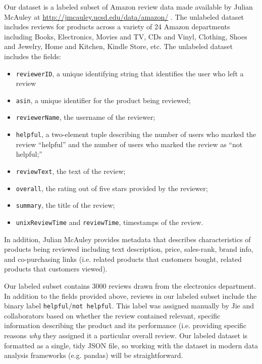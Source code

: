 \documentclass[a4paper]{article}
\begin{document}
Our dataset is a labeled subset of Amazon review data made available by Julian McAuley at \url{http://jmcauley.ucsd.edu/data/amazon/} \cite{he2016ups, mcauley2015image}.
The unlabeled dataset includes reviews for products across a variety of 24 Amazon departments including Books, Electronics, Movies and TV, CDs and Vinyl, Clothing, Shoes and Jewelry, Home and Kitchen, Kindle Store, etc.
The unlabeled dataset includes the fields:
\begin{itemize}
\item \texttt{reviewerID}, a unique identifying string that identifies the user who left a review
\item \texttt{asin}, a unique identifier for the product being reviewed;
\item \texttt{reviewerName}, the username of the reviewer;
\item \texttt{helpful}, a two-element tuple describing the number of users who marked the review ``helpful'' and the number of users who marked the review as ``not helpful;''
\item \texttt{reviewText}, the text of the review;
\item \texttt{overall}, the rating out of five stars provided by the reviewer;
\item \texttt{summary}, the title of the review;
\item \texttt{unixReviewTime} and \texttt{reviewTime}, timestamps of the review.
\end{itemize}


In addition, Julian McAuley provides metadata that describes characteristics of products being reviewed including text description, price, sales-rank, brand info, and co-purchasing links (i.e. related products that customers bought, related products that customers viewed).

Our labeled subset contains 3000 reviews drawn from the electronics department.
In addition to the fields provided above, reviews in our labeled subset include the binary label \texttt{helpful}/\texttt{not helpful}.
This label was assigned manually by Jie and collaborators based on whether the review contained relevant, specific information describing the product and its performance (i.e. providing specific reasons \textit{why} they assigned it a particular overall review.
Our labeled dataset is formatted as a single, tidy JSON file, so working with the dataset in modern data analysis frameworks (e.g. pandas) will be straightforward.




\end{document}
